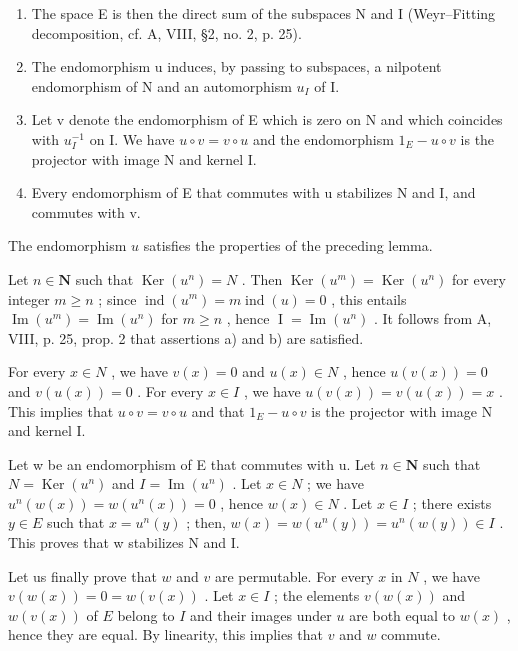 \begin{enumerate}
\def\labelenumi{\alph{enumi})}
\item
  The space E is then the direct sum of the subspaces N and I (Weyr–Fitting decomposition, cf. A, VIII, §2, no. 2, p. 25).
\item
  The endomorphism u induces, by passing to subspaces, a nilpotent endomorphism of N and an automorphism \(u_{I}\) of I.
\item
  Let v denote the endomorphism of E which is zero on N and which coincides with \(u_{I}^{-1}\) on I. We have \(u \circ v = v \circ u\) and the endomorphism \(1_{E} - u \circ v\) is the projector with image N and kernel I.
\item
  Every endomorphism of E that commutes with u stabilizes N and I, and commutes with v.
\end{enumerate}

The endomorphism \(u\) satisfies the properties of the preceding lemma.

Let \(n \in \mathbf{N}\) such that \(\operatorname{Ker}(u^{n}) = N\) . Then \(\operatorname{Ker}(u^{m}) = \operatorname{Ker}(u^{n})\) for every integer \(m \geqslant n\) ; since \(\operatorname{ind}(u^{m}) = m \operatorname{ind}(u) = 0\) , this entails \(\operatorname{Im}(u^{m}) = \operatorname{Im}(u^{n})\) for \(m \geqslant n\) , hence \(\operatorname{I} = \operatorname{Im}(u^{n})\) . It follows from A, VIII, p. 25, prop. 2 that assertions a) and b) are satisfied.

For every \(x \in N\) , we have \(v(x) = 0\) and \(u(x) \in N\) , hence \(u(v(x)) = 0\) and \(v(u(x)) = 0\) . For every \(x \in I\) , we have \(u(v(x)) = v(u(x)) = x\) . This implies that \(u \circ v = v \circ u\) and that \(1_{E} - u \circ v\) is the projector with image N and kernel I.

Let w be an endomorphism of E that commutes with u. Let \(n \in \mathbf{N}\) such that \(N = \operatorname{Ker}(u^{n})\) and \(I = \operatorname{Im}(u^{n})\) . Let \(x \in N\) ; we have \(u^{n}(w(x)) = w(u^{n}(x)) = 0\) , hence \(w(x) \in N\) . Let \(x \in I\) ; there exists \(y \in E\) such that \(x = u^{n}(y)\) ; then, \(w(x) = w(u^{n}(y)) = u^{n}(w(y)) \in I\) . This proves that w stabilizes N and I.

Let us finally prove that \(w\) and \(v\) are permutable. For every \(x\) in \(N\) , we have \(v(w(x)) = 0 = w(v(x))\) . Let \(x \in I\) ; the elements \(v(w(x))\) and \(w(v(x))\) of \(E\) belong to \(I\) and their images under \(u\) are both equal to \(w(x)\) , hence they are equal. By linearity, this implies that \(v\) and \(w\) commute.

